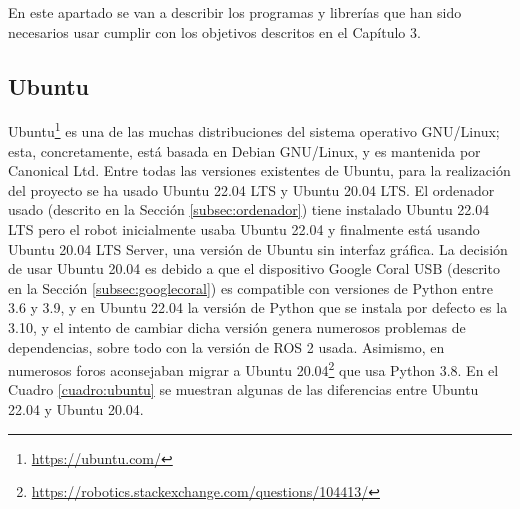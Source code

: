 En este apartado se van a describir los programas y librerías que han sido necesarios usar cumplir con los objetivos descritos en el Capítulo 3.

\subsection{Ubuntu}
\label{subsec:ubuntu}



Ubuntu\footnote{\url{https://ubuntu.com/}} es una de las muchas distribuciones del sistema operativo GNU/Linux; esta, concretamente, está basada en Debian GNU/Linux, y es mantenida por Canonical Ltd. Entre todas las versiones existentes de Ubuntu, para la realización del proyecto se ha usado Ubuntu 22.04 LTS y Ubuntu 20.04 LTS. El ordenador usado (descrito en la Sección \ref{subsec:ordenador}) tiene instalado Ubuntu 22.04 \ac{LTS} pero el robot inicialmente usaba Ubuntu 22.04 y finalmente está usando Ubuntu 20.04 \acs{LTS} Server, una versión de Ubuntu sin interfaz gráfica. La decisión de usar Ubuntu 20.04 es debido a que el dispositivo Google Coral USB (descrito en la Sección \ref{subsec:googlecoral}) es compatible con versiones de Python entre 3.6 y 3.9, y en Ubuntu 22.04 la versión de Python que se instala por defecto es la 3.10, y el intento de cambiar dicha versión genera numerosos problemas de dependencias, sobre todo con la versión de ROS 2 usada. Asimismo, en numerosos foros aconsejaban migrar a Ubuntu 20.04\footnote{\url{https://robotics.stackexchange.com/questions/104413/}} que usa Python 3.8. En el Cuadro \ref{cuadro:ubuntu} se muestran algunas de las diferencias entre Ubuntu 22.04 y Ubuntu 20.04.

